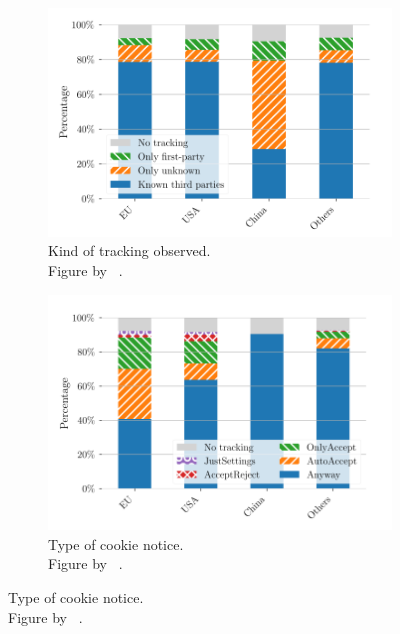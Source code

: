 \begin{figure}
    \centering
    \begin{subfigure}[b]{.5\textwidth}
        \centering
        \includegraphics[width=\textwidth, scale=0.32]{figures/tracking_kind_trans.png}
        \caption{Kind of tracking observed.\\Figure by \citeauthor{sanchez2019can}~\cite[Fig.~1]{sanchez2019can}.}
        \label{fig:tracking_kind}
    \end{subfigure}
    \begin{subfigure}[b]{.5\textwidth}
        \centering
        \includegraphics[width=\textwidth, scale=0.35]{figures/cookie_notice_type_trans.png}
        \caption{Type of cookie notice.\\Figure by \citeauthor{sanchez2019can}~\cite[Fig.~2b]{sanchez2019can}.}
        \label{notice_type}
    \end{subfigure}

\end{figure}
